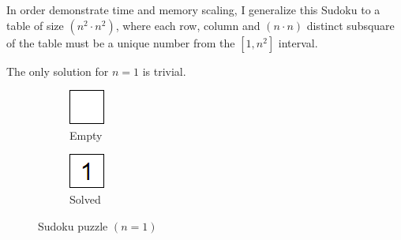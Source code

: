 In order demonstrate time and memory scaling, I generalize this Sudoku to a table of size $(n^2\cdot{} n^2)$, where each row, column and $(n\cdot{}n)$ distinct subsquare of the table must be a unique number from the $[1, n^2]$ interval.

The only solution for $n=1$ is trivial.

\begin{figure}[H]
  \centering
  \begin{subfigure}{.4\linewidth}
  \end{subfigure}
  \begin{subfigure}{.1\linewidth}
    \centering
    \includegraphics[width=0.6\linewidth]{content/assets/03_grovers_algorithm/sudoku_1_empty.png}
    \caption{Empty}
  \end{subfigure}
  \begin{subfigure}{.1\linewidth}
    \centering
    \includegraphics[width=0.6\linewidth]{content/assets/03_grovers_algorithm/sudoku_1_solution.png}
    \caption{Solved}
  \end{subfigure}
  \begin{subfigure}{.4\linewidth}
  \end{subfigure}
  \caption{Sudoku puzzle $(n=1)$}
\end{figure}

